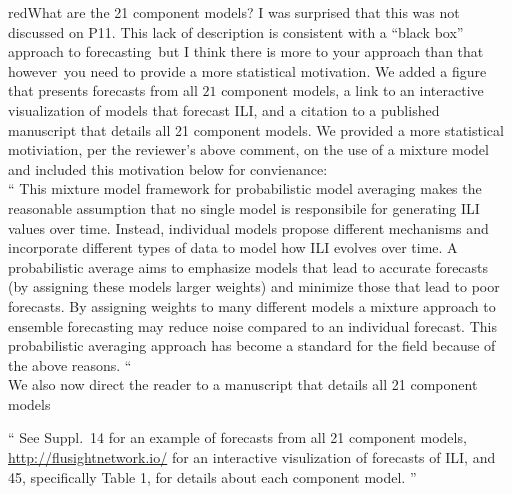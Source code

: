 \documentclass[
  fontsize=11pt,
  paper=a4,
  parskip=half,
  enlargefirstpage=on,    %
  fromalign=right,        %
  fromphone=on,           %
  fromrule=aftername,     %
  addrfield=on,           %
  backaddress=on,         %
  subject=beforeopening,  %
  locfield=narrow,        %
  foldmarks=on,           %
]{scrlttr2}
\begin{document}
    \begin{commt}{red}{What are the 21 component models? I was surprised that this was not discussed on P11.
        This lack of description is consistent with a “black box” approach to forecasting\, but I think there is more to your approach than that\, however\, you need to provide a more statistical motivation.}
      We added a figure that presents forecasts from all $21$ component models, a link to an interactive visualization of models that forecast ILI, and a citation to a published manuscript that details all 21 component models.
      We provided a more statistical motiviation, per the reviewer's above comment, on the use of a mixture model and included this motivation below for convienance:\\

      ``
      This mixture model framework for probabilistic model averaging makes the reasonable assumption that no single model is responsibile for generating ILI values over time.
      Instead, individual models propose different mechanisms and incorporate different types of data to model how ILI evolves over time.
      A probabilistic average aims to emphasize models that lead to accurate forecasts (by assigning these models larger weights) and minimize those that lead to poor forecasts.
      By assigning weights to many different models a mixture approach to ensemble forecasting may reduce noise compared to an individual forecast.
      This probabilistic averaging approach has become a standard for the field because of the above reasons.
      ``\\

      We also now direct the reader to a manuscript that details all 21 component models

      ``
      See Suppl.~14 for an example of forecasts from all 21 component models,  \href{Flusightnetwork.io}{http://flusightnetwork.io/} for an interactive visulization of forecasts of ILI, and 45, specifically Table 1, for details about each component model.
      ''
      
    \end{commt}
\end{document}
